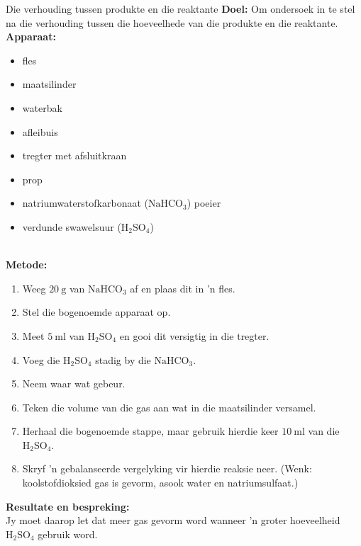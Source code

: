 \begin{g_experiment}{Die verhouding tussen produkte en die reaktante}
\textbf{Doel:} Om ondersoek in te stel na die verhouding tussen die hoeveelhede van die produkte en die reaktante.\\
\textbf{Apparaat:}\\
\begin{minipage}{.5\textwidth}
 \begin{itemize}[noitemsep]
  \item fles
\item maatsilinder
\item waterbak
\item afleibuis
\item tregter met afsluitkraan
\item prop
\item natriumwaterstofkarbonaat ($\text{NaHCO}_{3}$) poeier
\item verdunde swawelsuur ($\text{H}_{2}\text{SO}_{4}$)
 \end{itemize}
\end{minipage}
\begin{minipage}{.5\textwidth}
\begin{center}
\end{center}
\end{minipage} \\
\textbf{Metode:} 
\begin{enumerate}[noitemsep,label=\textbf{\arabic*}]
 \item Weeg $20~\text{g}$ van $\text{NaHCO}_{3}$ af en plaas dit in 'n fles.
\item Stel die bogenoemde apparaat op.
\item Meet $5~\text{ml}$ van $\text{H}_{2}\text{SO}_{4}$ en gooi dit versigtig in die tregter.
\item Voeg die $\text{H}_{2}\text{SO}_{4}$ stadig by die $\text{NaHCO}_{3}$.
\item Neem waar wat gebeur.
\item Teken die volume van die gas aan wat in die maatsilinder versamel.
\item Herhaal die bogenoemde stappe, maar gebruik hierdie keer $10~\text{ml}$ van die $\text{H}_{2}\text{SO}_{4}$.
\item Skryf 'n gebalanseerde vergelyking vir hierdie reaksie neer. (Wenk: koolstofdioksied gas is gevorm, asook water en natriumsulfaat.)
\end{enumerate}
\textbf{Resultate en bespreking:}\\
Jy moet daarop let dat meer gas gevorm word wanneer  'n groter hoeveelheid $\text{H}_{2}\text{SO}_{4}$ gebruik word. 
\end{g_experiment}

